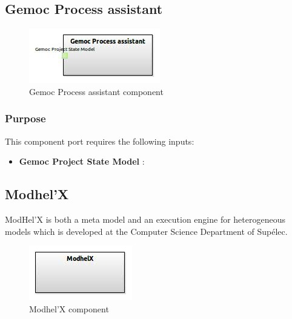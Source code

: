 \documentclass{gemoc} %
\begin{document}


\subsection{Gemoc Process assistant}

\begin{figure}[htp]
	\begin{center}
	\includegraphics*[trim=0.0cm 0.0cm 0cm 0.0cm, clip=true, scale=1.0]{../images/generated/Generated_Gemoc Process assistant.jpg}
	\caption{Gemoc Process assistant component}
	\end{center}
\end{figure}

\subsubsection{Purpose}

This component port requires the following inputs:
\begin{itemize}
  \item \textbf{Gemoc Project State Model} :
\end{itemize}


\subsection{Modhel'X}
ModHel'X is both a meta model and an execution engine for heterogeneous models which is developed at the Computer Science Department of Sup\'elec.
\begin{figure}[htp]
	\begin{center}
	\includegraphics*[trim=0.0cm 0.0cm 0cm 0.0cm, clip=true, scale=1.0]{../images/generated/Generated_Modhel'X.jpg}
	\caption{Modhel'X component}
	\end{center}
\end{figure}
\end{document}
